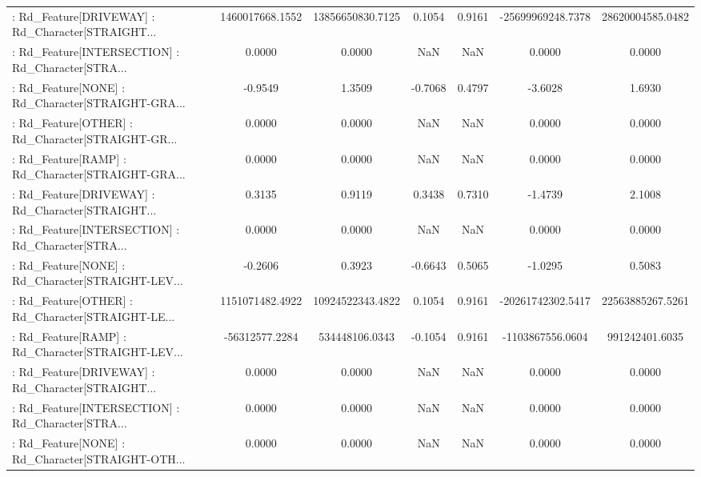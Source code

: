 \begin{longtable}{p{4cm}cccccc}
 : Rd\_Feature[DRIVEWAY] : Rd\_Character[STRAIGHT... &   1460017668.1552 &  13856650830.7125 &  0.1054 &       0.9161 &  -25699969248.7378 &  28620004585.0482 \\
 : Rd\_Feature[INTERSECTION] : Rd\_Character[STRA... &            0.0000 &            0.0000 &     NaN &          NaN &             0.0000 &            0.0000 \\
 : Rd\_Feature[NONE] : Rd\_Character[STRAIGHT-GRA... &           -0.9549 &            1.3509 & -0.7068 &       0.4797 &            -3.6028 &            1.6930 \\
 : Rd\_Feature[OTHER] : Rd\_Character[STRAIGHT-GR... &            0.0000 &            0.0000 &     NaN &          NaN &             0.0000 &            0.0000 \\
 : Rd\_Feature[RAMP] : Rd\_Character[STRAIGHT-GRA... &            0.0000 &            0.0000 &     NaN &          NaN &             0.0000 &            0.0000 \\
 : Rd\_Feature[DRIVEWAY] : Rd\_Character[STRAIGHT... &            0.3135 &            0.9119 &  0.3438 &       0.7310 &            -1.4739 &            2.1008 \\
 : Rd\_Feature[INTERSECTION] : Rd\_Character[STRA... &            0.0000 &            0.0000 &     NaN &          NaN &             0.0000 &            0.0000 \\
 : Rd\_Feature[NONE] : Rd\_Character[STRAIGHT-LEV... &           -0.2606 &            0.3923 & -0.6643 &       0.5065 &            -1.0295 &            0.5083 \\
 : Rd\_Feature[OTHER] : Rd\_Character[STRAIGHT-LE... &   1151071482.4922 &  10924522343.4822 &  0.1054 &       0.9161 &  -20261742302.5417 &  22563885267.5261 \\
 : Rd\_Feature[RAMP] : Rd\_Character[STRAIGHT-LEV... &    -56312577.2284 &    534448106.0343 & -0.1054 &       0.9161 &   -1103867556.0604 &    991242401.6035 \\
 : Rd\_Feature[DRIVEWAY] : Rd\_Character[STRAIGHT... &            0.0000 &            0.0000 &     NaN &          NaN &             0.0000 &            0.0000 \\
 : Rd\_Feature[INTERSECTION] : Rd\_Character[STRA... &            0.0000 &            0.0000 &     NaN &          NaN &             0.0000 &            0.0000 \\
 : Rd\_Feature[NONE] : Rd\_Character[STRAIGHT-OTH... &            0.0000 &            0.0000 &     NaN &          NaN &             0.0000 &            0.0000 \\

\end{longtable}
